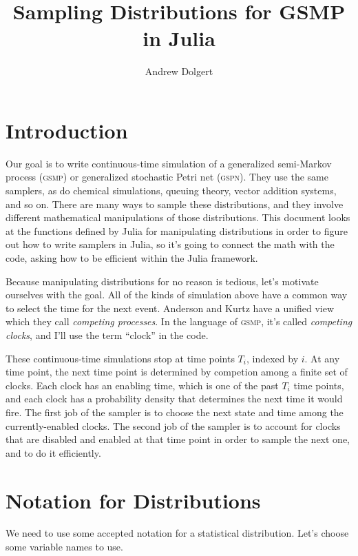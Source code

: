 \documentclass{article}
\title{Sampling Distributions for GSMP in Julia}
\author{Andrew Dolgert}
\newcommand{\gsmp}{\textsc{gsmp}\xspace}
\newcommand{\gspn}{\textsc{gspn}\xspace}
\begin{document}
\maketitle

\tableofcontents

\section{Introduction}

Our goal is to write continuous-time simulation of a generalized semi-Markov process (\gsmp) or generalized stochastic Petri net (\gspn). They use the same samplers, as do chemical simulations, queuing theory, vector addition systems, and so on.  There are many ways to sample these distributions, and they involve different mathematical manipulations of those distributions. This document looks at the functions defined by Julia for manipulating distributions in order to figure out how to write samplers in Julia, so it's going to connect the math with the code, asking how to be efficient within the Julia framework.

Because manipulating distributions for no reason is tedious, let's motivate ourselves with the goal. All of the kinds of simulation above have a common way to select the time for the next event. Anderson and Kurtz have a unified view which they call \emph{competing processes}. In the language of \gsmp, it's called \emph{competing clocks}, and I'll use the term ``clock'' in the code.

These continuous-time simulations stop at time points $T_i$, indexed by $i$. At any time point, the next time point is determined by competion among a finite set of clocks. Each clock has an enabling time, which is one of the past $T_i$ time points, and each clock has a probability density that determines the next time it would fire. The first job of the sampler is to choose the next state and time among the currently-enabled clocks. The second job of the sampler is to account for clocks that are disabled and enabled at that time point in order to sample the next one, and to do it efficiently.

\section{Notation for Distributions}\label{sec:notation}%

We need to use some accepted notation for a statistical distribution. Let's choose some variable names to use.
\end{document}
